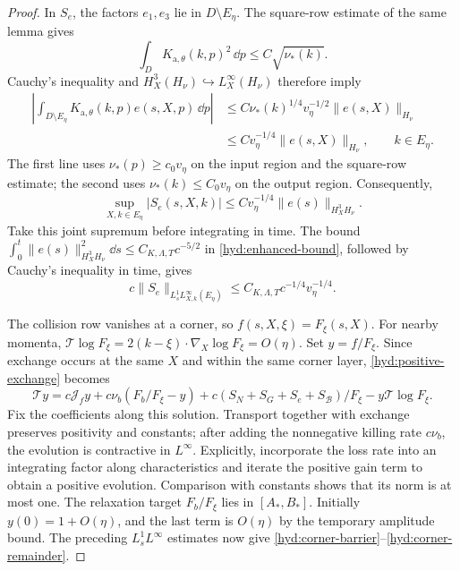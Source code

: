 \begin{proof}
 In $S_e$, the factors $e_1,e_3$ lie in $D\setminus E_\eta$.
 The square-row estimate of the same lemma gives
 \[
 \int_D K_{\mathrm a,\theta}(k,p)^2\,\dd p
       \le C\sqrt{\nu_*(k)}.
 \]
 Cauchy's inequality and
 $H_X^3(H_\nu)\hookrightarrow L_X^\infty(H_\nu)$ therefore imply
 \[
 \begin{split}
 \left|\int_{D\setminus E_\eta}K_{\mathrm a,\theta}(k,p)
                                      e(s,X,p)\,\dd p\right|
 &\le C\nu_*(k)^{1/4}v_\eta^{-1/2}
                                      \|e(s,X)\|_{H_\nu}\\
 &\le Cv_\eta^{-1/4}\|e(s,X)\|_{H_\nu},\qquad k\in E_\eta.
 \end{split}
 \]
 The first line uses $\nu_*(p)\ge c_0v_\eta$ on the input region and
 the square-row estimate; the second uses $\nu_*(k)\le C_0v_\eta$ on
 the output region. Consequently,
 \[
 \sup_{X,k\in E_\eta}|S_e(s,X,k)|
 \le Cv_\eta^{-1/4}\|e(s)\|_{H_X^3H_\nu}.
 \]
 Take this joint supremum before integrating in time. The bound
 $\int_0^t\|e(s)\|_{H_X^3H_\nu}^2\dd s\le C_{K,\Lambda,T}c^{-5/2}$
 in \eqref{hyd:enhanced-bound}, followed by Cauchy's inequality in time,
 gives
 \begin{equation}\label{hyd:corner-error-source}
 c\|S_e\|_{L^1_sL^\infty_{X,k}(E_\eta)}
       \le C_{K,\Lambda,T}c^{-1/4}v_\eta^{-1/4}.
 \end{equation}

 The collision row vanishes at a corner, so
 $f(s,X,\xi)=F_\xi(s,X)$. For nearby momenta,
 $\mathcal T\log F_\xi
 =2(k-\xi)\cdot\nabla_X\log F_\xi=O(\eta)$.
 Set $y=f/F_\xi$. Since exchange occurs at the same $X$ and within
 the same corner layer, \eqref{hyd:positive-exchange} becomes
 \[
 \mathcal Ty=c\mathcal J_fy+c\nu_b(F_b/F_\xi-y)
   +c(S_N+S_G+S_e+S_{\mathcal B})/F_\xi
   -y\mathcal T\log F_\xi.
 \]
 Fix the coefficients along this solution. Transport together with
 exchange preserves positivity and constants; after adding the
 nonnegative killing rate $c\nu_b$, the evolution is contractive in
 $L^\infty$. Explicitly, incorporate the loss rate into an integrating
 factor along characteristics and iterate the positive gain term to
 obtain a positive evolution. Comparison with constants shows that its
 norm is at most one. The relaxation target
 $F_b/F_\xi$ lies in $[A_*,B_*]$. Initially $y(0)=1+O(\eta)$, and the
 last term is $O(\eta)$ by the temporary amplitude bound. The preceding
 $L^1_sL^\infty$ estimates now give
 \eqref{hyd:corner-barrier}--\eqref{hyd:corner-remainder}.
\end{proof}

